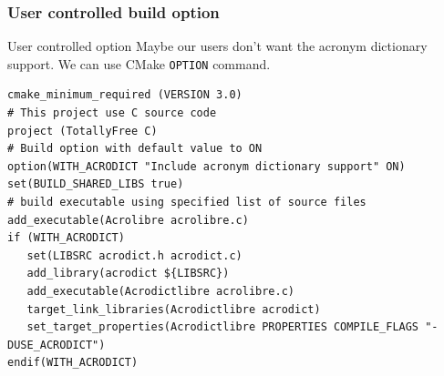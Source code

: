 \documentclass[compress,slidestop,table
              ]
               {beamer}
\begin{document}
\begin{frame}[fragile]
\frametitle{User controlled build option}
\begin{alertblock}{User controlled option}
Maybe our users don't want the acronym dictionary support.
We can use CMake \lstinline!OPTION! command.
\end{alertblock}
\begin{lstlisting}[basicstyle=\tiny,caption=User controlled build option]
cmake_minimum_required (VERSION 3.0)
# This project use C source code
project (TotallyFree C)
# Build option with default value to ON
option(WITH_ACRODICT "Include acronym dictionary support" ON)
set(BUILD_SHARED_LIBS true)
# build executable using specified list of source files
add_executable(Acrolibre acrolibre.c)
if (WITH_ACRODICT)
   set(LIBSRC acrodict.h acrodict.c)
   add_library(acrodict ${LIBSRC})
   add_executable(Acrodictlibre acrolibre.c)
   target_link_libraries(Acrodictlibre acrodict)
   set_target_properties(Acrodictlibre PROPERTIES COMPILE_FLAGS "-DUSE_ACRODICT")
endif(WITH_ACRODICT)
\end{lstlisting}
\end{frame}
\end{document}
